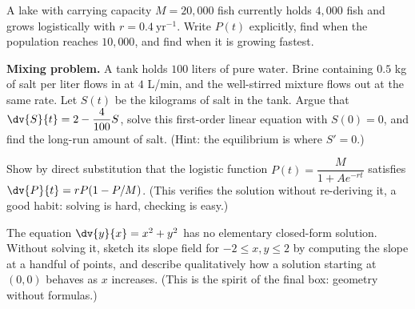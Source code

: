 \begin{exercise}
A lake with carrying capacity $M=20{,}000$ fish currently holds $4{,}000$ fish and
grows logistically with $r=0.4\ \text{yr}^{-1}$. Write $P(t)$ explicitly, find when
the population reaches $10{,}000$, and find when it is growing fastest.
\end{exercise}

\begin{exercise}
\textbf{Mixing problem.} A tank holds $100$ liters of pure water. Brine containing
$0.5$ kg of salt per liter flows in at $4$ L/min, and the well-stirred mixture
flows out at the same rate. Let $S(t)$ be the kilograms of salt in the tank. Argue
that $\dv{S}{t} = 2 - \dfrac{4}{100}S$, solve this first-order linear equation with
$S(0)=0$, and find the long-run amount of salt. (Hint: the equilibrium is where
$S'=0$.)
\end{exercise}

\begin{exercise}
Show by direct substitution that the logistic function
$P(t)=\dfrac{M}{1+Ae^{-rt}}$ satisfies $\dv{P}{t}=rP(1-P/M)$. (This verifies the
solution without re-deriving it, a good habit: solving is hard, checking is easy.)
\end{exercise}

\begin{exercise}
The equation $\dv{y}{x} = x^2 + y^2$ has no elementary closed-form solution. Without
solving it, sketch its slope field for $-2\le x,y\le 2$ by computing the slope at a
handful of points, and describe qualitatively how a solution starting at $(0,0)$
behaves as $x$ increases. (This is the spirit of the final box: geometry without
formulas.)
\end{exercise}
